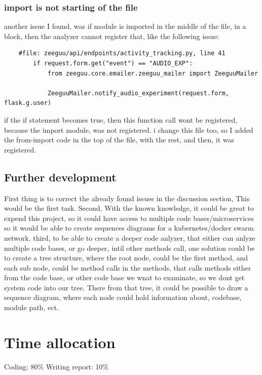 \documentclass[12pt,a4paper]{report}
\begin{document}
    \subsection{import is not starting of the file}
    another issue I found, was if module is imported in the middle of the file, in a block, then the analyzer cannot register that, like the following issue: 
    \begin{lstlisting}
    #file: zeeguu/api/endpoints/activity_tracking.py, line 41
        if request.form.get("event") == "AUDIO_EXP":
            from zeeguu.core.emailer.zeeguu_mailer import ZeeguuMailer

            ZeeguuMailer.notify_audio_experiment(request.form, flask.g.user)
    \end{lstlisting}
    if the if statement becomes true, then this function call wont be registered, because the import module, was not registered. 
    i change this file too, so I added the from-import code in the top of the file, with the rest, and then, it was registered. 

    \section{Further development} 

    First thing is to correct the already found issues in the discussion section, This would be the first task. 
    Second, With the known knowledge, it could be great to expend this project, so it could have access to multiple code bases/microservices so it would be able to create sequences diagrams for a kubernetes/docker swarm network. third, to be able to create a deeper code anlyzer, that either can anlyze multiple code bases, or go deeper, intil other methods call, one solution could be to create a tree structure, where the root node, could be the first method, and each sub node, could be method calls in the methods, that calls methods either from the code base, or other code base we wnat to examinate, so we dont get system code into our tree. There from that tree, it could be possible to draw a sequence diagram, where each node could hold information about, codebase, module path, ect. 


    \chapter{Time allocation}

    Coding: 80\% \newline
    Writing report: 10\%
\end{document}
